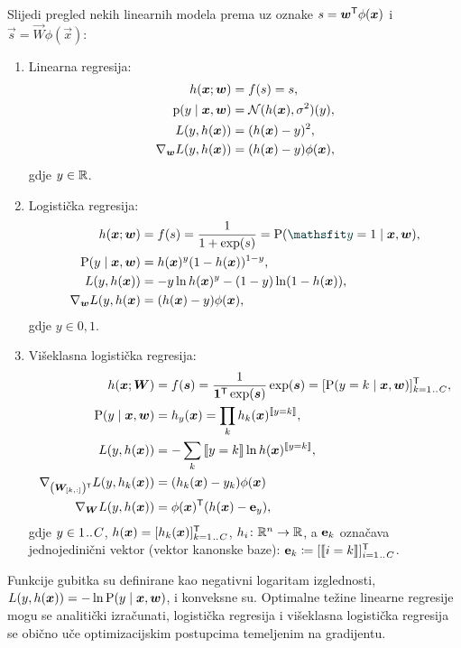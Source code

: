 \documentclass[utf8, diplomski, lmodern]{fer}
\begin{document}
Slijedi pregled nekih linearnih modela prema \citet{Snajder:2017:SULR2} uz oznake $s=\vec w^\tp\phi(\vec x)$ i $\vec s=\vec W\phi(\vec x)$:
\begin{enumerate}
\item Linearna regresija:
\begin{align*}
h(\vec x;\vec w) &= f(s) = s, \\
\p(y\mid\vec x,\vec w) &= \mathcal{N}(h(\vec x),\sigma^2)(y), \\
L(y, h(\vec x)) &= \del{h(\vec x)-y}^2, \\
\nabla_{\vec w}L(y, h(\vec x)) &= \del{h(\vec x)-y}\phi(\vec x),
\end{align*}
gdje $y\in\mathbb{R}$.
\item Logistička regresija:
\begin{align*}
h(\vec x;\vec w) &= f(s) 
= \frac{1}{1+\exp\del{s}} = \P(\rvar y=1\mid\vec x,\vec w), \\
\P(y\mid\vec x,\vec w) &= h(\vec x)^y(1-h(\vec x))^{1-y}, \\
L(y, h(\vec x)) &= -y\ln h(\vec x)^y-(1-y)\ln(1-h(\vec x)), \\
\nabla_{\vec w}L(y, h(\vec x) &= \del{h(\vec x)-y}\phi(\vec x),
\end{align*}
gdje $y\in{0,1}$. 
\item Višeklasna logistička regresija:
\begin{align*}
h(\vec x;\vec W) &= f(\vec s) 
= \frac{1}{\cvec 1^\tp\exp(\vec s)}\exp(\vec s) = \sbr{\P(y=k\mid\vec x,\vec w)}_{k=1\bidot C}^\tp, \\
\P(y\mid\vec x,\vec w) &= h_y(\vec x) = \prod_k h_k(\vec x)^\enbbracket{y=k}, \\
L(y, h(\vec x)) &= -\sum_k \enbbracket{y=k}\ln h(\vec x)^\enbbracket{y=k}, \\
\nabla_{\del{\vec W_\ind{k,:}}^\tp}L(y, h_k(\vec x)) &= \del{h_k(\vec x)-y_k}\phi(\vec x) \\
\nabla_{\vec W}L(y, h(\vec x)) &= \phi(\vec x)^\tp \del{h(\vec x)-\cvec e_y} \text{,}
\end{align*}
gdje $y\in{1\mkern1.5mu{..}\mkern1.5muC}$, $h(\vec x)=\sbr{h_k(\vec x)}_{k=1\bidot C}^\tp$, $h_i \colon \mathbb{R}^n \to \mathbb{R}$, a $\mathbf{e}_k$ označava jednojedinični vektor (vektor kanonske baze): $\cvec e_k\coloneqq\sbr{\enbbracket{i=k}}_{i=1\bidot C}^\tp$.
\end{enumerate}
Funkcije gubitka su definirane kao negativni logaritam izglednosti, $L(y, h(\vec x))=-\ln\P(y\mid\vec x,\vec w)$, i konveksne su. Optimalne težine linearne regresije mogu se analitički izračunati, logistička regresija i višeklasna logistička regresija se obično uče optimizacijskim postupcima temeljenim na gradijentu.
\end{document}
